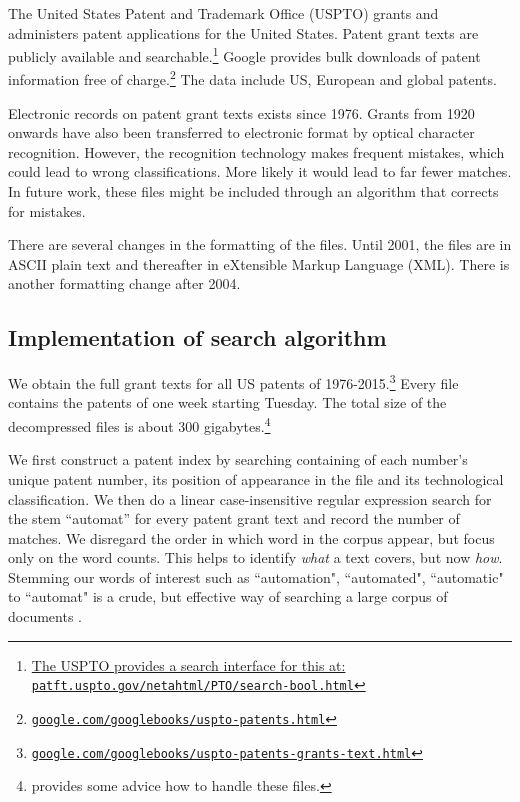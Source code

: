 \documentclass[11pt,a4paper,fleqn]{article}
\begin{document}
The United States Patent and Trademark Office (USPTO) grants and administers patent applications for the United States. Patent grant texts are publicly available and searchable.\footnote{\href{http://patft.uspto.gov/netahtml/PTO/search-bool.html}{The USPTO provides a search interface for this at: \texttt{patft.uspto.gov/netahtml/PTO/search-bool.html}}} Google provides bulk downloads of patent information free of charge.\footnote{\href{www.google.com/googlebooks/uspto-patents.html}{\texttt{google.com/googlebooks/uspto-patents.html}}} The data include US, European and global patents. 

Electronic records on patent grant texts exists since 1976. Grants from 1920 onwards have also been transferred to electronic format by optical character recognition. However, the recognition technology makes frequent mistakes, which could lead to wrong classifications. More likely it would lead to far fewer matches. In future work, these files might be included through an algorithm that corrects for mistakes.

There are several changes in the formatting of the files. Until 2001, the files are in ASCII plain text and thereafter in eXtensible Markup Language (XML). There is another formatting change after 2004.


\subsection{Implementation of search algorithm}
We obtain the full grant texts for all US patents of 1976-2015.\footnote{\href{http://www.google.com/googlebooks/uspto-patents-grants-text.html}{\texttt{google.com/googlebooks/uspto-patents-grants-text.html}}}  Every file contains the patents of one week starting Tuesday. The total size of the decompressed files is about 300 gigabytes.\footnote{\cite{F2013} provides some advice how to handle these files.}  

We first construct a patent index by searching containing of each number's unique patent number, its position of appearance in the file and its technological classification. We then do a linear case-insensitive regular expression search for the stem ``automat'' for every patent grant text and record the number of matches. We disregard the order in which word in the corpus appear, but focus only on the word counts. This helps to identify \textit{what} a text covers, but now \textit{how}. Stemming our words of interest such as ``automation", ``automated", ``automatic" to ``automat" is a crude, but effective way of searching a large corpus of documents \citep{MRS2009}.
\end{document}
